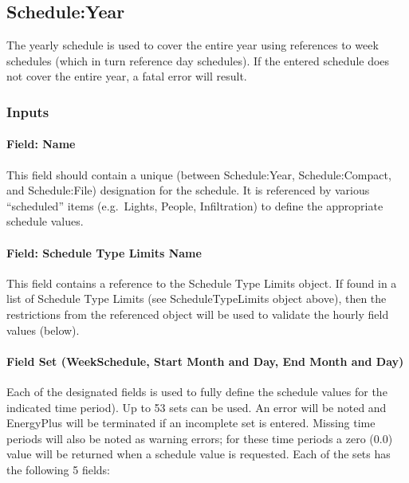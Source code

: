 \subsection{Schedule:Year}\label{scheduleyear}

The yearly schedule is used to cover the entire year using references to week schedules (which in turn reference day schedules). If the entered schedule does not cover the entire year, a fatal error will result.

\subsubsection{Inputs}\label{inputs-6-023}

\paragraph{Field: Name}\label{field-name-5-021}

This field should contain a unique (between Schedule:Year, Schedule:Compact, and Schedule:File) designation for the schedule. It is referenced by various ``scheduled'' items (e.g.~Lights, People, Infiltration) to define the appropriate schedule values.

\paragraph{Field: Schedule Type Limits Name}\label{field-schedule-type-limits-name-3}

This field contains a reference to the Schedule Type Limits object. If found in a list of Schedule Type Limits (see ScheduleTypeLimits object above), then the restrictions from the referenced object will be used to validate the hourly field values (below).

\paragraph{Field Set (WeekSchedule, Start Month and Day, End Month and Day)}\label{field-set-weekschedule-start-month-and-day-end-month-and-day}

Each of the designated fields is used to fully define the schedule values for the indicated time period). Up to 53 sets can be used. An error will be noted and EnergyPlus will be terminated if an incomplete set is entered. Missing time periods will also be noted as warning errors; for these time periods a zero (0.0) value will be returned when a schedule value is requested. Each of the sets has the following 5 fields:

